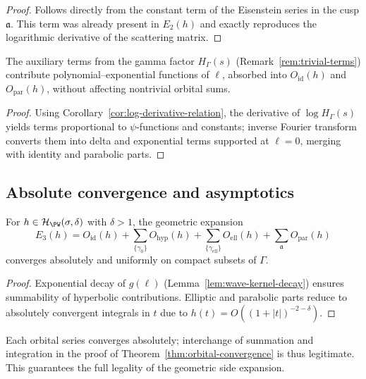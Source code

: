 \begin{proof}\relax
Follows directly from the constant term of the Eisenstein series in the cusp $\mathfrak a$. This term was already present in $E_2(h)$ and exactly reproduces the logarithmic derivative of the scattering matrix. \relax
\end{proof}

\begin{lemma}
\label{lem:trivial-gamma}
The auxiliary terms from the gamma factor $H_\Gamma(s)$ (Remark~\ref{rem:trivial-terms}) contribute polynomial–exponential functions of $\ell$, absorbed into $O_{\mathrm{id}}(h)$ and $O_{\mathrm{par}}(h)$, without affecting nontrivial orbital sums.
\end{lemma}

\begin{proof}\relax
Using Corollary~\ref{cor:log-derivative-relation}, the derivative of $\log H_\Gamma(s)$ yields terms proportional to $\psi$-functions and constants; inverse Fourier transform converts them into delta and exponential terms supported at $\ell=0$, merging with identity and parabolic parts. \relax
\end{proof}

\subsection{Absolute convergence and asymptotics}
\label{subsec:ch4-part5-convergence} \relax

\begin{theorem}
\label{thm:orbital-convergence}
For $h\in\mathcal{H}_{\PW}(\sigma,\delta)$ with $\delta>1$, the geometric expansion
\[
E_3(h)=O_{\mathrm{id}}(h)
+\sum_{\{\gamma_0\}}O_{\mathrm{hyp}}(h)
+\sum_{\{\gamma_{\mathrm{ell}}\}}O_{\mathrm{ell}}(h)
+\sum_{\mathfrak a}O_{\mathrm{par}}(h)
\]
converges absolutely and uniformly on compact subsets of $\Gamma$. \relax
\end{theorem}

\begin{proof}\relax
Exponential decay of $g(\ell)$ (Lemma~\ref{lem:wave-kernel-decay}) ensures summability of hyperbolic contributions. Elliptic and parabolic parts reduce to absolutely convergent integrals in $t$ due to $h(t)=O((1+|t|)^{-2-\delta})$. \relax
\end{proof}

\begin{invariant}
Each orbital series converges absolutely; interchange of summation and integration in the proof of Theorem~\ref{thm:orbital-convergence} is thus legitimate. This guarantees the full legality of the geometric side expansion. \relax
\end{invariant}

